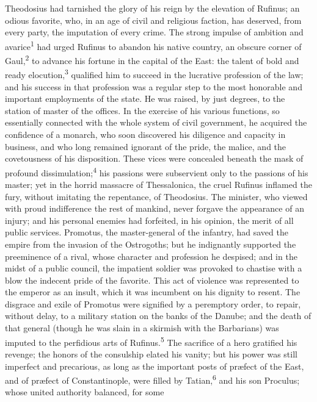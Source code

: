 Theodosius had tarnished the glory of his reign by the elevation
of Rufinus; an odious favorite, who, in an age of civil and
religious faction, has deserved, from every party, the imputation
of every crime. The strong impulse of ambition and avarice\textsuperscript{1} had
urged Rufinus to abandon his native country, an obscure corner of
Gaul,\textsuperscript{2} to advance his fortune in the capital of the East: the
talent of bold and ready elocution,\textsuperscript{3} qualified him to succeed in
the lucrative profession of the law; and his success in that
profession was a regular step to the most honorable and important
employments of the state. He was raised, by just degrees, to the
station of master of the offices. In the exercise of his various
functions, so essentially connected with the whole system of
civil government, he acquired the confidence of a monarch, who
soon discovered his diligence and capacity in business, and who
long remained ignorant of the pride, the malice, and the
covetousness of his disposition. These vices were concealed
beneath the mask of profound dissimulation;\textsuperscript{4} his passions were
subservient only to the passions of his master; yet in the horrid
massacre of Thessalonica, the cruel Rufinus inflamed the fury,
without imitating the repentance, of Theodosius. The minister,
who viewed with proud indifference the rest of mankind, never
forgave the appearance of an injury; and his personal enemies had
forfeited, in his opinion, the merit of all public services.
Promotus, the master-general of the infantry, had saved the
empire from the invasion of the Ostrogoths; but he indignantly
supported the preeminence of a rival, whose character and
profession he despised; and in the midst of a public council, the
impatient soldier was provoked to chastise with a blow the
indecent pride of the favorite. This act of violence was
represented to the emperor as an insult, which it was incumbent
on his dignity to resent. The disgrace and exile of Promotus were
signified by a peremptory order, to repair, without delay, to a
military station on the banks of the Danube; and the death of
that general (though he was slain in a skirmish with the
Barbarians) was imputed to the perfidious arts of Rufinus.\textsuperscript{5} The
sacrifice of a hero gratified his revenge; the honors of the
consulship elated his vanity; but his power was still imperfect
and precarious, as long as the important posts of præfect of the
East, and of præfect of Constantinople, were filled by Tatian,\textsuperscript{6}
and his son Proculus; whose united authority balanced, for some
